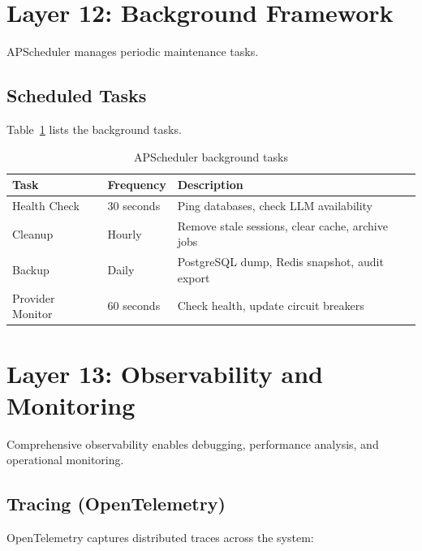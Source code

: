 \documentclass[a4paper,twoside]{sapthesis}
\begin{document}
\section{Layer 12: Background Framework}
\label{sec:layer12-background}

APScheduler manages periodic maintenance tasks.

\subsection{Scheduled Tasks}
\label{subsec:scheduled-tasks}

Table~\ref{tab:scheduled-tasks} lists the background tasks.

\begin{table}[htbp]
\centering
\caption{APScheduler background tasks}
\label{tab:scheduled-tasks}
\begin{tabular}{@{}lll@{}}
\toprule
\textbf{Task} & \textbf{Frequency} & \textbf{Description} \\
\midrule
Health Check & 30 seconds & Ping databases, check LLM availability \\
Cleanup & Hourly & Remove stale sessions, clear cache, archive jobs \\
Backup & Daily & PostgreSQL dump, Redis snapshot, audit export \\
Provider Monitor & 60 seconds & Check health, update circuit breakers \\
\bottomrule
\end{tabular}
\end{table}

\section{Layer 13: Observability and Monitoring}
\label{sec:layer13-observability}

Comprehensive observability enables debugging, performance analysis, and operational monitoring.

\subsection{Tracing (OpenTelemetry)}
\label{subsec:otel-tracing}

OpenTelemetry captures distributed traces across the system:
\end{document}
